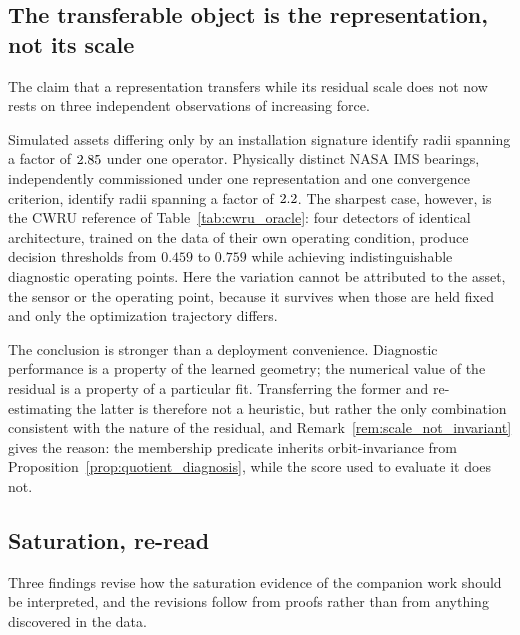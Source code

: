\documentclass[a4paper]{cas-sc}
\begin{document}
\subsection{The transferable object is the representation, not its scale}
\label{subsec:disc_scale}

The claim that a representation transfers while its residual scale does not
now rests on three independent observations of increasing force.

Simulated assets differing only by an installation signature identify radii
spanning a factor of \(2.85\) under one operator. Physically distinct NASA IMS
bearings, independently commissioned under one representation and one
convergence criterion, identify radii spanning a factor of \(2.2\). The
sharpest case, however, is the CWRU reference of
Table~\ref{tab:cwru_oracle}: four detectors of identical architecture, trained
on the data of their own operating condition, produce decision thresholds from
\(0.459\) to \(0.759\) while achieving indistinguishable diagnostic operating
points. Here the variation cannot be attributed to the asset, the sensor or
the operating point, because it survives when those are held fixed and only
the optimization trajectory differs.

The conclusion is stronger than a deployment convenience. Diagnostic
performance is a property of the learned geometry; the numerical value of the
residual is a property of a particular fit. Transferring the former and
re-estimating the latter is therefore not a heuristic, but rather
the only combination consistent with the nature of the residual, and
Remark~\ref{rem:scale_not_invariant} gives the reason: the membership
predicate inherits orbit-invariance from
Proposition~\ref{prop:quotient_diagnosis}, while the score used to evaluate it
does not.

\subsection{Saturation, re-read}
\label{subsec:disc_saturation}

Three findings revise how the saturation evidence of the companion work
\citep{disanti2026inverse} should be interpreted, and the revisions follow
from proofs rather than from anything discovered in the data.
\end{document}
